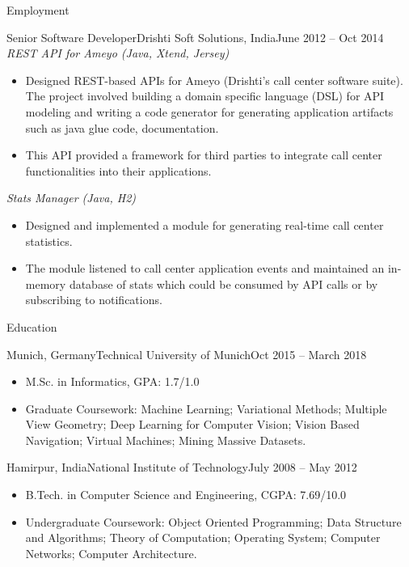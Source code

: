 \documentclass[]{mcdowellcv}
\begin{document}
\begin{cvsection}{Employment}
        \begin{cvsubsection}{Senior Software Developer}{Drishti Soft Solutions, India}{June 2012 -- Oct 2014}
            \textit{REST API for Ameyo (Java, Xtend, Jersey)}
            \begin{itemize}
                \item Designed REST-based APIs for Ameyo (Drishti's call center software suite). The project involved building a domain specific language (DSL) for API modeling and writing a code generator for generating application artifacts such as java glue code, documentation.
                \item This API provided a framework for third parties to integrate call center functionalities into their applications.
            \end{itemize}
            
            \textit{Stats Manager (Java, H2)}
            \begin{itemize}
                \item Designed and implemented a module for generating real-time call center statistics. 
                \item The module listened to call center application events and maintained an in-memory database of stats which could be consumed by API calls or by subscribing to notifications.
            \end{itemize}
        \end{cvsubsection}
    \end{cvsection}
    

    \begin{cvsection}{Education}
        \begin{cvsubsection}{Munich, Germany}{Technical University of Munich}{Oct 2015 -- March 2018}
            \begin{itemize}
                \item M.Sc. in Informatics, GPA: 1.7/1.0
                \item Graduate Coursework: Machine Learning; Variational Methods; Multiple View Geometry; Deep Learning for Computer Vision; Vision Based Navigation; Virtual Machines; Mining Massive Datasets.
            \end{itemize}
        \end{cvsubsection}
        \begin{cvsubsection}{Hamirpur, India}{National Institute of Technology}{July 2008 -- May 2012}
            \begin{itemize}
                \item B.Tech. in Computer Science and Engineering,  CGPA: 7.69/10.0
                \item Undergraduate Coursework: Object Oriented Programming; Data Structure and Algorithms; Theory of Computation; Operating System; Computer Networks; Computer Architecture.
            \end{itemize}
        \end{cvsubsection}
    \end{cvsection}
    
\end{document}
